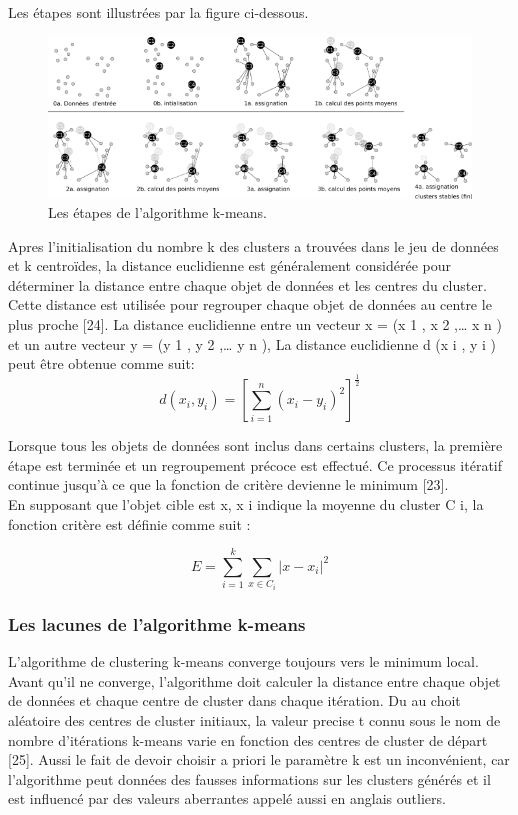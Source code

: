 Les étapes sont illustrées par la figure ci-dessous.

\begin{figure}[H]
	\begin{center}
		\includegraphics[width=\textwidth]{images/chapitre6/kmeans_steps.png}
	\end{center}
	\caption{Les étapes de l'algorithme k-means.}
	\label{kmeans_steps}
\end{figure}

Apres l’initialisation du nombre k des clusters a trouvées dans le jeu de données et k centroïdes, la distance euclidienne est généralement considérée pour déterminer la distance entre chaque objet de données et les centres du cluster. Cette distance est utilisée pour regrouper chaque objet de données au centre le plus proche [24]. La distance euclidienne entre un vecteur x = (x 1 , x 2 ,… x n ) et un autre vecteur y = (y 1 , y 2 ,… y n ), La distance euclidienne d (x i , y i ) peut être obtenue comme suit:
\begin{equation}
    d(x_{i}, y_{i}) = \left[\sum_{i=1}^{n}(x_{i} - y_{i})^{2} \right]^{\frac{1}{2}}
\end{equation}

Lorsque tous les objets de données sont inclus dans certains clusters, la première étape est terminée et un regroupement précoce est effectué. Ce processus itératif continue jusqu'à ce que la fonction de critère devienne le minimum [23]. \\
En supposant que l'objet cible est x, x i indique la moyenne du cluster C i, la fonction critère est définie comme suit :

\begin{equation}
    E = \sum_{i=1}^{k} \sum_{x \in C_{i}} \left\lvert x - x_{i} \right\rvert^{2}
\end{equation}

\subsubsection{Les lacunes de l’algorithme k-means}
L'algorithme de clustering k-means converge toujours vers le minimum local. Avant qu’il ne converge, l'algorithme doit calculer la distance entre chaque objet de données et chaque centre de cluster dans chaque itération. Du au choit aléatoire des centres de cluster initiaux, la valeur precise t connu sous le nom de nombre d'itérations k-means varie en fonction des centres de cluster de départ [25]. Aussi le fait de devoir choisir a priori le paramètre k est un inconvénient, car l’algorithme peut données des fausses informations sur les clusters générés et il est influencé par des valeurs aberrantes appelé aussi en anglais outliers.

